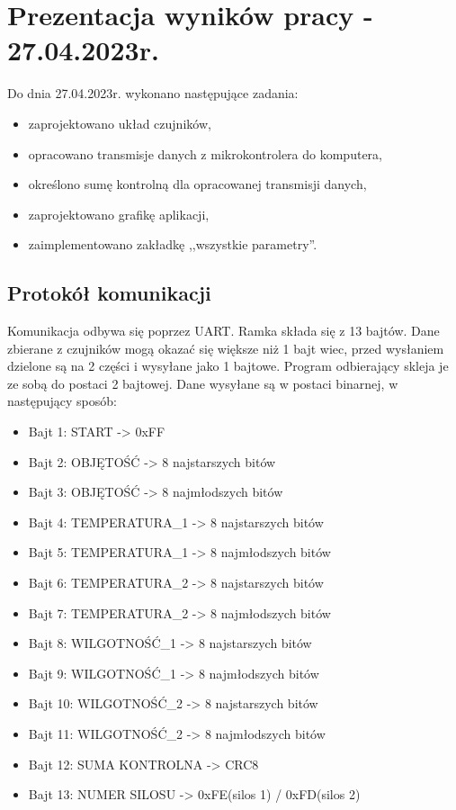 \section{Prezentacja wyników pracy - 27.04.2023r.}
    Do dnia 27.04.2023r. wykonano następujące zadania:
    \begin{itemize}
        \item zaprojektowano układ czujników,
        \item opracowano transmisje danych z mikrokontrolera do komputera,
        \item określono sumę kontrolną dla opracowanej transmisji danych,
        \item zaprojektowano grafikę aplikacji,
        \item zaimplementowano zakładkę ,,wszystkie parametry''. 
    \end{itemize}

    \subsection{Protokół komunikacji}
        Komunikacja odbywa się poprzez UART. Ramka składa się z 13 bajtów. Dane 
        zbierane z czujników mogą okazać się większe niż 1 bajt wiec,
        przed wysłaniem dzielone są na 2 części i wysyłane jako 1 bajtowe. Program odbierający
        skleja je ze sobą do postaci 2 bajtowej. Dane wysyłane są w postaci  binarnej,
        w następujący sposób:
        \begin{itemize}
            \item Bajt 1: START -> 0xFF
            \item Bajt 2: OBJĘTOŚĆ -> 8 najstarszych bitów
            \item Bajt 3: OBJĘTOŚĆ -> 8 najmłodszych bitów
            \item Bajt 4: TEMPERATURA\_1 -> 8 najstarszych bitów
            \item Bajt 5: TEMPERATURA\_1 -> 8 najmłodszych  bitów
            \item Bajt 6: TEMPERATURA\_2 -> 8 najstarszych bitów
            \item Bajt 7: TEMPERATURA\_2 -> 8 najmłodszych  bitów
            \item Bajt 8: WILGOTNOŚĆ\_1 ->  8 najstarszych bitów
            \item Bajt 9: WILGOTNOŚĆ\_1 ->  8 najmłodszych bitów
            \item Bajt 10: WILGOTNOŚĆ\_2 ->  8 najstarszych  bitów
            \item Bajt 11: WILGOTNOŚĆ\_2 ->  8 najmłodszych  bitów
            \item Bajt 12: SUMA KONTROLNA -> CRC8
            \item Bajt 13: NUMER SILOSU -> 0xFE(silos 1) / 0xFD(silos 2)
        \end{itemize}
